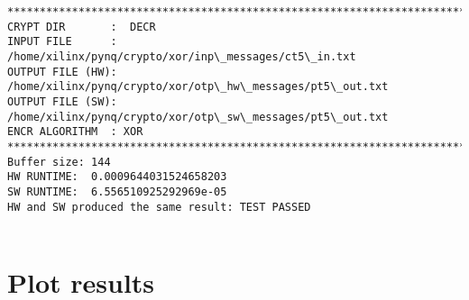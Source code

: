 \documentclass[11pt]{article}
\begin{document}
\begin{Verbatim}[commandchars=\\\{\}]
********************************************************************************
CRYPT DIR       :  DECR
INPUT FILE      :  /home/xilinx/pynq/crypto/xor/inp\_messages/ct5\_in.txt
OUTPUT FILE (HW):  /home/xilinx/pynq/crypto/xor/otp\_hw\_messages/pt5\_out.txt
OUTPUT FILE (SW):  /home/xilinx/pynq/crypto/xor/otp\_sw\_messages/pt5\_out.txt
ENCR ALGORITHM  : XOR
********************************************************************************
Buffer size: 144
HW RUNTIME:  0.0009644031524658203
SW RUNTIME:  6.556510925292969e-05
HW and SW produced the same result: TEST PASSED


    \end{Verbatim}

    \section{Plot results}\label{plot-results}
\end{document}

